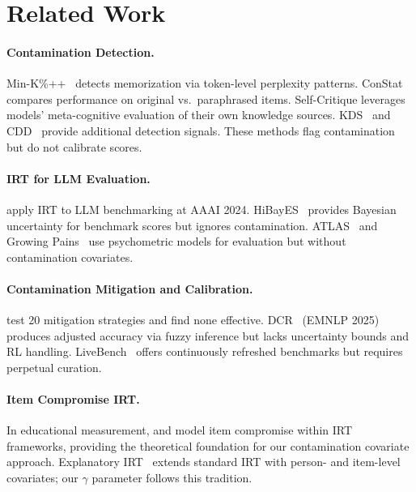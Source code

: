 \documentclass[letterpaper,11pt]{article}
\begin{document}
\section{Related Work}

\paragraph{Contamination Detection.}
Min-K\%++~\citep{shi2024detecting} detects memorization via token-level perplexity patterns.
ConStat~\citep{dekoninck2024constat} compares performance on original vs.\ paraphrased items.
Self-Critique leverages models' meta-cognitive evaluation of their own knowledge sources.
KDS~\citep{dong2024generalization} and CDD~\citep{oren2024proving} provide additional detection signals.
These methods flag contamination but do not calibrate scores.

\paragraph{IRT for LLM Evaluation.}
\citet{lalor2024benchmarking} apply IRT to LLM benchmarking at AAAI 2024.
HiBayES~\citep{polo2024tinybenchmarks} provides Bayesian uncertainty for benchmark scores but ignores contamination.
ATLAS~\citep{sedoc2020item} and Growing Pains~\citep{vania2021comparing} use psychometric models for evaluation but without contamination covariates.

\paragraph{Contamination Mitigation and Calibration.}
\citet{xu2024benchmark} test 20 mitigation strategies and find none effective.
DCR~\citep{yang2023dcr} (EMNLP 2025) produces adjusted accuracy via fuzzy inference but lacks uncertainty bounds and RL handling.
LiveBench~\citep{white2024livebench} offers continuously refreshed benchmarks but requires perpetual curation.

\paragraph{Item Compromise IRT.}
In educational measurement, \citet{eckerly2017detecting} and \citet{sinharay2017simultaneous} model item compromise within IRT frameworks, providing the theoretical foundation for our contamination covariate approach.
Explanatory IRT~\citep{deboeck2004explanatory} extends standard IRT with person- and item-level covariates; our $\gamma$ parameter follows this tradition.
\end{document}
